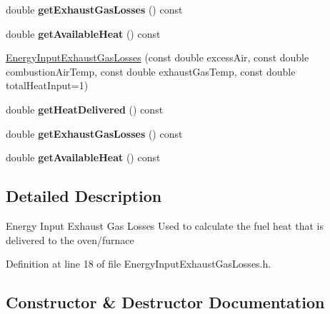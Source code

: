 \begin{DoxyCompactItemize}
double {\bfseries get\+Exhaust\+Gas\+Losses} () const
\item 
\mbox{\label{class_energy_input_exhaust_gas_losses_ac1e7691e1b6ce514d242faf806590179}} 
double {\bfseries get\+Available\+Heat} () const
\item 
\hyperlink{class_energy_input_exhaust_gas_losses_ab61da88b40504e71d2907ed8d997df85}{Energy\+Input\+Exhaust\+Gas\+Losses} (const double excess\+Air, const double combustion\+Air\+Temp, const double exhaust\+Gas\+Temp, const double total\+Heat\+Input=1)
\item 
\mbox{\label{class_energy_input_exhaust_gas_losses_a139f89d11cb663632ee9ccc27e242b07}} 
double {\bfseries get\+Heat\+Delivered} () const
\item 
\mbox{\label{class_energy_input_exhaust_gas_losses_aff089e129d329769d895e489928eb059}} 
double {\bfseries get\+Exhaust\+Gas\+Losses} () const
\item 
\mbox{\label{class_energy_input_exhaust_gas_losses_ac1e7691e1b6ce514d242faf806590179}} 
double {\bfseries get\+Available\+Heat} () const
\end{DoxyCompactItemize}


\subsection{Detailed Description}
Energy Input Exhaust Gas Losses Used to calculate the fuel heat that is delivered to the oven/furnace 

Definition at line 18 of file Energy\+Input\+Exhaust\+Gas\+Losses.\+h.



\subsection{Constructor \& Destructor Documentation}
\mbox{\label{class_energy_input_exhaust_gas_losses_ab61da88b40504e71d2907ed8d997df85}} 
